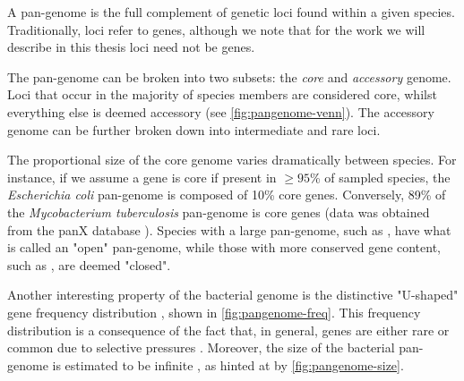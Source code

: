 A pan-genome is the full complement of genetic loci found within a given species. Traditionally, loci refer to genes, although we note that for the work we will describe in this thesis loci need not be genes.

The pan-genome can be broken into two subsets: the \textit{core} and \textit{accessory} genome. Loci that occur in the majority of species members are considered core, whilst everything else is deemed accessory (see \autoref{fig:pangenome-venn}). The accessory genome can be further broken down into intermediate and rare loci. 

The proportional size of the core genome varies dramatically between species. For instance, if we assume a gene is core if present in $\ge 95$\% of sampled species, the \textit{Escherichia coli} pan-genome is composed of 10\% core genes. Conversely, 89\% of the \textit{Mycobacterium tuberculosis} pan-genome is core genes (data was obtained from the panX database \cite{panx}). Species with a large pan-genome, such as \ecoli{}, have what is called an "open" pan-genome, while those with more conserved gene content, such as \mtb{}, are deemed "closed". 

Another interesting property of the bacterial genome is the distinctive "U-shaped" gene frequency distribution \cite{Lobkovsky2013,pandora,Lapierre2009}, shown in \autoref{fig:pangenome-freq}. This frequency distribution is a consequence of the fact that, in general, genes are either rare or common due to selective pressures \cite{Lobkovsky2013,thepangenome2020}. Moreover, the size of the bacterial pan-genome is estimated to be infinite \cite{Lapierre2009}, as hinted at by \autoref{fig:pangenome-size}.

